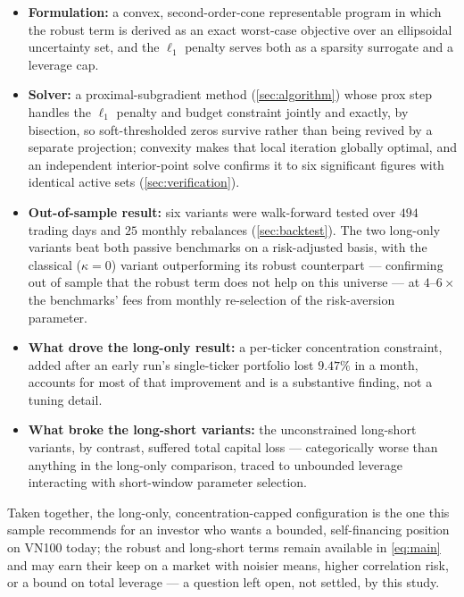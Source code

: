 \begin{itemize}
  \item \textbf{Formulation:} a convex, second-order-cone representable program in which the
        robust term is derived as an exact worst-case objective over an ellipsoidal uncertainty
        set, and the $\ell_1$ penalty serves both as a sparsity surrogate and a leverage cap.

  \item \textbf{Solver:} a proximal-subgradient method (\cref{sec:algorithm}) whose prox step
        handles the $\ell_1$ penalty and budget constraint jointly and exactly, by bisection, so
        soft-thresholded zeros survive rather than being revived by a separate projection;
        convexity makes that local iteration globally optimal, and an independent interior-point
        solve confirms it to six significant figures with identical active sets
        (\cref{sec:verification}).

  \item \textbf{Out-of-sample result:} six variants were walk-forward tested over $494$ trading
        days and $25$ monthly rebalances (\cref{sec:backtest}). The two long-only variants beat
        both passive benchmarks on a risk-adjusted basis, with the classical ($\kappa=0$) variant
        outperforming its robust counterpart --- confirming out of sample that the robust term does
        not help on this universe --- at $4$--$6\times$ the benchmarks' fees from monthly
        re-selection of the risk-aversion parameter.

  \item \textbf{What drove the long-only result:} a per-ticker concentration constraint, added
        after an early run's single-ticker portfolio lost $9.47\%$ in a month, accounts for most
        of that improvement and is a substantive finding, not a tuning detail.

  \item \textbf{What broke the long-short variants:} the unconstrained long-short variants, by
        contrast, suffered total capital loss --- categorically worse than anything in the
        long-only comparison, traced to unbounded leverage interacting with short-window parameter
        selection.
\end{itemize}

Taken together, the long-only, concentration-capped configuration is the one this sample
recommends for an investor who wants a bounded, self-financing position on VN100 today; the
robust and long-short terms remain available in \cref{eq:main} and may earn their keep on a
market with noisier means, higher correlation risk, or a bound on total leverage --- a question
left open, not settled, by this study.
